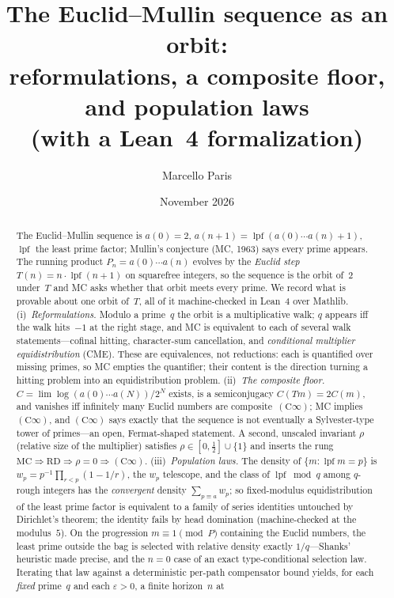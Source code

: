 \documentclass[10pt,a4paper]{article}
\title{The Euclid--Mullin sequence as an orbit:\\
reformulations, a composite floor, and population laws\\
{\large (with a Lean~4 formalization)}}
\author{Marcello Paris}
\date{November 2026}
\newcommand{\lpf}{\operatorname{lpf}}
\newcommand{\Cinf}{(\mathrm{C}\infty)}
\begin{document}
\maketitle

\begin{abstract}
The Euclid--Mullin sequence is $a(0)=2$, $a(n{+}1)=\lpf(a(0)\cdots a(n)+1)$,
$\lpf$ the least prime factor; Mullin's conjecture (MC, 1963) says every
prime appears.  The running product $P_n=a(0)\cdots a(n)$ evolves by the \emph{Euclid step}
$T(n)=n\cdot\lpf(n{+}1)$ on squarefree integers, so the sequence is the
orbit of~$2$ under~$T$ and MC asks whether that orbit meets every prime.  We record what is provable about one orbit of~$T$, all of it
machine-checked in Lean~4 over Mathlib.  (i)~\emph{Reformulations.}
Modulo a prime~$q$ the orbit is a multiplicative walk; $q$ appears iff the
walk hits~$-1$ at the right stage, and MC is equivalent to each of several
walk statements---cofinal hitting, character-sum cancellation, and
\emph{conditional multiplier equidistribution} (CME).  These are
equivalences, not reductions: each is quantified over missing primes, so
MC empties the quantifier; their content is the direction turning a
hitting problem into an equidistribution problem.  (ii)~\emph{The
composite floor.}  $C=\lim\log(a(0)\cdots a(N))/2^{N}$ exists, is a
semiconjugacy $C(Tm)=2C(m)$, and vanishes iff infinitely many Euclid
numbers are composite~$\Cinf$; MC implies $\Cinf$, and $\Cinf$ says
exactly that the sequence is not eventually a Sylvester-type tower of
primes---an open, Fermat-shaped statement.  A second, unscaled invariant
$\rho$ (relative size of the multiplier) satisfies $\rho\in[0,\tfrac12]\cup\{1\}$
and inserts the rung $\mathrm{MC}\Rightarrow\mathrm{RD}\Rightarrow\rho=0\Rightarrow\Cinf$.
(iii)~\emph{Population laws.}  The density of $\{m:\lpf m=p\}$ is
$w_p=p^{-1}\prod_{r<p}(1-1/r)$, the $w_p$ telescope, and the class of
$\lpf\bmod q$ among $q$-rough integers has the \emph{convergent} density
$\sum_{p\equiv a}w_p$; so fixed-modulus equidistribution of the least
prime factor is equivalent to a family of series identities untouched by
Dirichlet's theorem; the identity fails by head domination (machine-checked
at the modulus~$5$).  On
the progression $m\equiv1\pmod P$ containing the Euclid numbers, the least
prime outside the bag is selected with relative density exactly
$1/q$---Shanks' heuristic made precise, and the $n=0$ case of an exact
type-conditional selection law.  Iterating that law
against a deterministic per-path compensator bound yields, for each
\emph{fixed} prime~$q$ and each $\varepsilon>0$, a finite horizon~$n$ at

\end{abstract}
\end{document}
